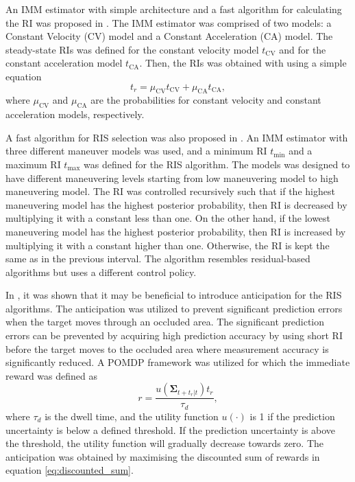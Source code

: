 \documentclass[english, 12pt, a4paper, elec, utf8, a-1b, online]{aaltothesis}
\renewcommand{\vec}[1]{\mathbf{#1}}
\newcommand{\tmax}{t_\text{max}}
\newcommand{\tmin}{t_\text{min}}
\newcommand{\muca}{\mu_{\text{CA}}}
\newcommand{\mucv}{\mu_{\text{CV}}}
\newcommand{\ri}{t_r}
\begin{document}
 An IMM estimator with simple architecture and a fast algorithm for calculating the RI was proposed in \cite{Benoudnine2006}.
The IMM estimator was comprised of two models: a Constant Velocity (CV) model and a Constant Acceleration (CA) model.
The steady-state RIs was defined for the constant velocity model $t_\text{CV}$ and for the constant acceleration model $t_\text{CA}$.
Then, the RIs was obtained with using a simple equation
\begin{equation}\label{eq:fimm}
    \ri = \mucv t_\text{CV} + \muca t_\text{CA},
\end{equation}
where $\mucv$ and $\muca$ are the probabilities for constant velocity and constant acceleration models, respectively.

A fast algorithm for RIS selection was also proposed in \cite{MasoumiGanjgah2017}.
An IMM estimator with three different maneuver models was used, and a minimum RI $\tmin$ and a maximum RI $\tmax$ was defined for the RIS algorithm.
The models was designed to have different maneuvering levels starting from low maneuvering model to high maneuvering model.
The RI was controlled recursively such that if the highest maneuvering model has the highest posterior probability, then RI is decreased by multiplying it with a constant less than one.
On the other hand, if the lowest maneuvering model has the highest posterior probability, then RI is increased by multiplying it with a constant higher than one.
Otherwise, the RI is kept the same as in the previous interval.
The algorithm resembles residual-based algorithms but uses a different control policy.

In \cite{Charlish2015}, it was shown that it may be beneficial to introduce anticipation for the RIS algorithms.
The anticipation was utilized to prevent significant prediction errors when the target moves through an occluded area.
The significant prediction errors can be prevented by acquiring high prediction accuracy by using short RI before the target moves to the occluded area where measurement accuracy is significantly reduced.
A POMDP framework was utilized for which the immediate reward was defined as
\begin{equation}
    r = \frac{u\left(\vec{\Sigma}_{t+\ri|t} \right) \ri}{\tau_d},
\end{equation}
where $\tau_d$ is the dwell time, and the utility function $u(\cdot)$ is 1 if the prediction uncertainty is below a defined threshold.
If the prediction uncertainty is above the threshold, the utility function will gradually decrease towards zero.
The anticipation was obtained by maximising the discounted sum of rewards in equation \eqref{eq:discounted_sum}.
\end{document}
